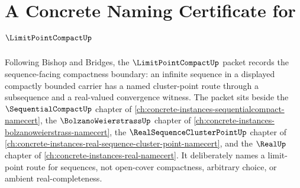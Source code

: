 \chapter{A Concrete Naming Certificate for $\LimitPointCompactUp$}
\label{ch:concrete-instances-limit-point-compact-namecert}

Following Bishop and Bridges, the $\LimitPointCompactUp$ packet records the sequence-facing compactness boundary: an infinite sequence in a displayed compactly bounded carrier has a named cluster-point route through a subsequence and a real-valued convergence witness. The packet sits beside the $\SequentialCompactUp$ chapter of \autoref{ch:concrete-instances-sequentialcompact-namecert}, the $\BolzanoWeierstrassUp$ chapter of \autoref{ch:concrete-instances-bolzanoweierstrass-namecert}, the $\RealSequenceClusterPointUp$ chapter of \autoref{ch:concrete-instances-real-sequence-cluster-point-namecert}, and the $\RealUp$ chapter of \autoref{ch:concrete-instances-real-namecert}. It deliberately names a limit-point route for sequences, not open-cover compactness, arbitrary choice, or ambient real-completeness.


